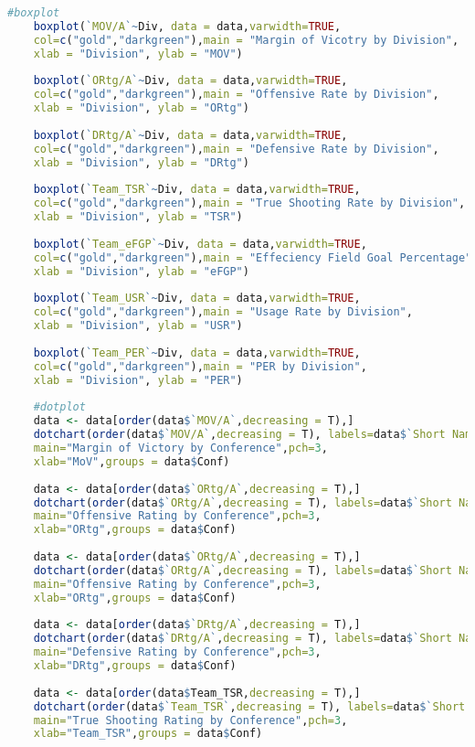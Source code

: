 \begin{lstlisting}[language=R,caption=My code]
	#boxplot
	boxplot(`MOV/A`~Div, data = data,varwidth=TRUE,
	col=c("gold","darkgreen"),main = "Margin of Vicotry by Division",
	xlab = "Division", ylab = "MOV")
	
	boxplot(`ORtg/A`~Div, data = data,varwidth=TRUE,
	col=c("gold","darkgreen"),main = "Offensive Rate by Division",
	xlab = "Division", ylab = "ORtg")
	
	boxplot(`DRtg/A`~Div, data = data,varwidth=TRUE,
	col=c("gold","darkgreen"),main = "Defensive Rate by Division",
	xlab = "Division", ylab = "DRtg")
	
	boxplot(`Team_TSR`~Div, data = data,varwidth=TRUE,
	col=c("gold","darkgreen"),main = "True Shooting Rate by Division",
	xlab = "Division", ylab = "TSR")
	
	boxplot(`Team_eFGP`~Div, data = data,varwidth=TRUE,
	col=c("gold","darkgreen"),main = "Effeciency Field Goal Percentage",
	xlab = "Division", ylab = "eFGP")
	
	boxplot(`Team_USR`~Div, data = data,varwidth=TRUE,
	col=c("gold","darkgreen"),main = "Usage Rate by Division",
	xlab = "Division", ylab = "USR")
	
	boxplot(`Team_PER`~Div, data = data,varwidth=TRUE,
	col=c("gold","darkgreen"),main = "PER by Division",
	xlab = "Division", ylab = "PER")
	
	#dotplot 
	data <- data[order(data$`MOV/A`,decreasing = T),]
	dotchart(order(data$`MOV/A`,decreasing = T), labels=data$`Short Name`, cex=.7,
	main="Margin of Victory by Conference",pch=3,
	xlab="MoV",groups = data$Conf)
	
	data <- data[order(data$`ORtg/A`,decreasing = T),]
	dotchart(order(data$`ORtg/A`,decreasing = T), labels=data$`Short Name`, cex=.7,
	main="Offensive Rating by Conference",pch=3,
	xlab="ORtg",groups = data$Conf)
	
	data <- data[order(data$`ORtg/A`,decreasing = T),]
	dotchart(order(data$`ORtg/A`,decreasing = T), labels=data$`Short Name`, cex=.7,
	main="Offensive Rating by Conference",pch=3,
	xlab="ORtg",groups = data$Conf)
	
	data <- data[order(data$`DRtg/A`,decreasing = T),]
	dotchart(order(data$`DRtg/A`,decreasing = T), labels=data$`Short Name`, cex=.7,
	main="Defensive Rating by Conference",pch=3,
	xlab="DRtg",groups = data$Conf)
	
	data <- data[order(data$Team_TSR,decreasing = T),]
	dotchart(order(data$`Team_TSR`,decreasing = T), labels=data$`Short Name`, cex=.7,
	main="True Shooting Rating by Conference",pch=3,
	xlab="Team_TSR",groups = data$Conf)
	

\end{lstlisting}
